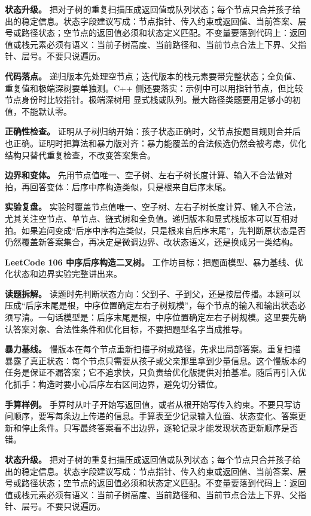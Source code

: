 \textbf{状态升级。} 把对子树的重复扫描压成返回值或队列状态；每个节点只合并孩子给出的稳定信息。状态字段建议写成：节点指针、传入约束或返回值、当前答案、层号或路径状态；空节点的返回值必须和状态定义匹配。不变量要落到代码上：返回值或栈元素必须有语义：当前子树高度、当前路径和、当前节点合法上下界、父指针、层号。不要只说遍历。

\textbf{代码落点。} 递归版本先处理空节点；迭代版本的栈元素要带完整状态；全负值、重复值和极端深树要单独测。C++ 侧还要落实：示例中可以用指针节点，但比较节点身份时比较指针。极端深树用  显式栈或队列。最大路径类题要用足够小的初值，不能默认零。

\textbf{正确性检查。} 证明从子树归纳开始：孩子状态正确时，父节点按题目规则合并后也正确。证明时把算法和暴力版对齐：暴力能覆盖的合法候选仍然会被考虑，优化结构只替代重复检查，不改变答案集合。

\textbf{边界和变体。} 先用节点值唯一、空子树、左右子树长度计算、输入不合法做对拍，再回答变体：后序中序构造类似，只是根来自后序末尾。

\textbf{实验复盘。} 实验时覆盖节点值唯一、空子树、左右子树长度计算、输入不合法，尤其关注空节点、单节点、链式树和全负值。递归版本和显式栈版本可以互相对拍。如果追问变成“后序中序构造类似，只是根来自后序末尾”，先判断原状态是否仍然覆盖新答案集合，再决定是微调边界、改状态语义，还是换成另一类结构。

\noindent\textbf{LeetCode 106 中序后序构造二叉树。} 工作坊目标：把题面模型、暴力基线、优化状态和边界实验完整讲出来。

\textbf{读题拆解。} 读题时先判断状态方向：父到子、子到父，还是按层传播。本题可以压成“后序末尾是根，中序位置确定左右子树规模”，每个节点的输入和输出状态必须写清。一句话模型是：后序末尾是根，中序位置确定左右子树规模。这里要先确认答案对象、合法性条件和优化目标，不要把题型名字当成推导。

\textbf{暴力基线。} 慢版本在每个节点重新扫描子树或路径，先求出局部答案。重复扫描暴露了真正状态：每个节点只需要从孩子或父亲那里拿到少量信息。这个慢版本的任务是保证不漏答案；它不追求快，只负责给优化版提供对拍基准。随后再引入优化抓手：构造时要小心后序左右区间边界，避免切分错位。

\textbf{手算样例。} 手算时从叶子开始写返回值，或者从根开始写传入约束。不要只写访问顺序，要写每条边上传递的信息。手算表至少记录输入位置、状态变化、答案更新和停止条件。只写最终答案看不出边界，逐轮记录才能发现状态更新顺序是否错。

\textbf{状态升级。} 把对子树的重复扫描压成返回值或队列状态；每个节点只合并孩子给出的稳定信息。状态字段建议写成：节点指针、传入约束或返回值、当前答案、层号或路径状态；空节点的返回值必须和状态定义匹配。不变量要落到代码上：返回值或栈元素必须有语义：当前子树高度、当前路径和、当前节点合法上下界、父指针、层号。不要只说遍历。

